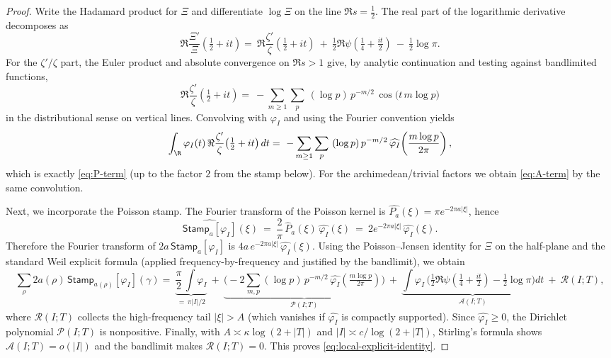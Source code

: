 \documentclass[11pt]{article}
\theoremstyle{remark}
\begin{document}
\begin{proof}
Write the Hadamard product for $\Xi$ and differentiate $\log\Xi$ on the line $\Re s=\tfrac12$. The real part of the logarithmic derivative decomposes as
\[
 \Re\frac{\Xi'}{\Xi}\!\left(\tfrac12+it\right)
 =\ \Re\frac{\zeta'}{\zeta}\!\left(\tfrac12+it\right)\ +\ \tfrac12\Re\psi\!\left(\tfrac14+\tfrac{it}{2}\right)\ -\ \tfrac12\log\pi.
\]
For the $\zeta'/\zeta$ part, the Euler product and absolute convergence on $\Re s>1$ give, by analytic continuation and testing against bandlimited functions,
\[
 \Re\frac{\zeta'}{\zeta}\!\left(\tfrac12+it\right)
 =\ -\sum_{m\ge 1}\sum_{p}\ (\log p)\,p^{-m/2}\,\cos\big(t\,m\log p\big)
\]
in the distributional sense on vertical lines. Convolving with $\varphi_I$ and using the Fourier convention yields
\[
 \int_{\R} \varphi_I(t)\,\Re\frac{\zeta'}{\zeta}\!\left(\tfrac12+it\right)dt
 =\ -\sum_{m\ge 1}\sum_{p}\ (\log p)\,p^{-m/2}\,\widehat{\varphi_I}\!\left(\frac{m\log p}{2\pi}\right),
\]
which is exactly \eqref{eq:P-term} (up to the factor $2$ from the stamp below). For the archimedean/trivial factors we obtain \eqref{eq:A-term} by the same convolution.

Next, we incorporate the Poisson stamp. The Fourier transform of the Poisson kernel is $\widehat{P_a}(\xi)=\pi e^{-2\pi a|\xi|}$, hence
\[
 \widehat{\mathsf{Stamp}_a[\varphi_I]}(\xi)\ =\ \frac{2}{\pi}\,\widehat P_a(\xi)\,\widehat{\varphi_I}(\xi)\ =\ 2e^{-2\pi a|\xi|}\,\widehat{\varphi_I}(\xi).
\]
Therefore the Fourier transform of $2a\,\mathsf{Stamp}_a[\varphi_I]$ is $4a\,e^{-2\pi a|\xi|}\,\widehat{\varphi_I}(\xi)$. Using the Poisson–Jensen identity for $\Xi$ on the half-plane and the standard Weil explicit formula (applied frequency-by-frequency and justified by the bandlimit), we obtain
\[
 \sum_{\rho} 2a(\rho)\,\mathsf{Stamp}_{a(\rho)}[\varphi_I](\gamma)
 =\ \underbrace{\frac{\pi}{2}\,\int \varphi_I}_{=\,\pi|I|/2}\ +\ \underbrace{\Big(-2\sum_{m,p}(\log p)\,p^{-m/2}\,\widehat{\varphi_I}(\tfrac{m\log p}{2\pi})\Big)}_{\mathcal P(I;T)}\ +\ \underbrace{\int \varphi_I\,\Big(\tfrac12\Re\psi(\tfrac14+\tfrac{it}{2})-\tfrac12\log\pi\Big)dt}_{\mathcal A(I;T)}\ +\ \mathcal R(I;T),
\]
where $\mathcal R(I;T)$ collects the high-frequency tail $|\xi|>A$ (which vanishes if $\widehat{\varphi_I}$ is compactly supported). Since $\widehat{\varphi_I}\ge 0$, the Dirichlet polynomial $\mathcal P(I;T)$ is nonpositive. Finally, with $A\asymp \kappa\log(2+|T|)$ and $|I|\asymp c/\log(2+|T|)$, Stirling’s formula shows $\mathcal A(I;T)=o(|I|)$ and the bandlimit makes $\mathcal R(I;T)=0$. This proves \eqref{eq:local-explicit-identity}.\qedhere
\end{proof}
\end{document}
